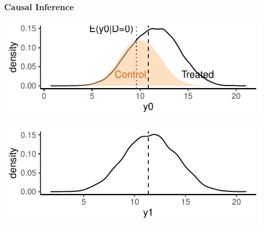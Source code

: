 \documentclass[xcolor=x11names,compress]{beamer}\usepackage[]{graphicx}\usepackage[]{color}
\makeatletter
\def\maxwidth{ %
  \ifdim\Gin@nat@width>\linewidth
    \linewidth
  \else
    \Gin@nat@width
  \fi
}
\newenvironment{knitrout}{}{} %
\renewcommand{\(}{\begin{columns}}
\renewcommand{\)}{\end{columns}}
\newcommand{\<}[1]{\begin{column}{#1}}
\renewcommand{\>}{\end{column}}
\makeatother
\begin{document}
\begin{frame}
\frametitle{Causal Inference}
\begin{knitrout}
\color{fgcolor}
\includegraphics[width=\maxwidth]{figure/OVB1c-1} 

\end{knitrout}

\begin{knitrout}
\color{fgcolor}
\includegraphics[width=\maxwidth]{figure/OVB2c-1} 

\end{knitrout}
\end{frame}
\end{document}
